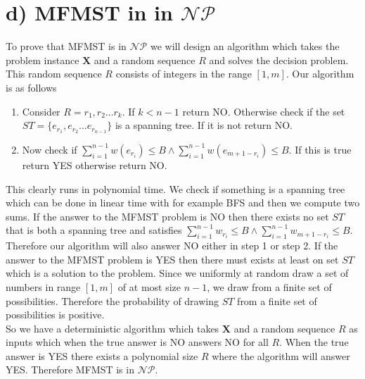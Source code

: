 \section*{d) MFMST in in $\mathcal{NP}$}

To prove that MFMST is in $\mathcal{NP}$ we will design an algorithm which takes the problem instance $\mathbf{X}$ and a random sequence $R$ and solves the decision problem. This random sequence $R$ consists of integers in the range $[1,m]$. Our algorithm is as follows

\begin{enumerate}
    \item Consider $R=r_1,r_2\dots r_k$. If $k < n-1$ return NO.
    Otherwise check if the set $ST = \{e_{r_1},e_{r_2}\dots e_{r_{n-1}}\}$ is a spanning tree. If it is not return NO.
    \item Now check if $\sum_{i=1}^{n-1}w(e_{r_i}) \leq B \land \sum_{i=1}^{n-1}w(e_{m+1-r_i}) \leq B$. If this is true return YES otherwise return NO.
\end{enumerate}

This clearly runs in polynomial time. We check if something is a spanning tree which can be done in linear time with for example BFS and then we compute two sums. If the answer to the MFMST problem is NO then there exists no set $ST$ that is both a spanning tree and satisfies $\sum_{i=1}^{n-1}w_{r_i} \leq B \land \sum_{i=1}^{n-1}w_{m+1-r_i} \leq B$. Therefore our algorithm will also answer NO either in step 1 or step 2. If the answer to the MFMST problem is YES then there must exists at least on set $ST$ which is a solution to the problem. Since we uniformly at random draw a set of numbers in range $[1,m]$ of at most size $n-1$, we draw from a finite set of possibilities. Therefore the probability of drawing $ST$ from a finite set of possibilities is positive.\\
So we have a deterministic algorithm which takes $\mathbf{X}$ and a random sequence $R$ as inputs which when the true answer is NO answers NO for all $R$. When the true answer is YES there exists a polynomial size $R$ where the algorithm will answer YES. Therefore MFMST is in $\mathcal{NP}$. 
